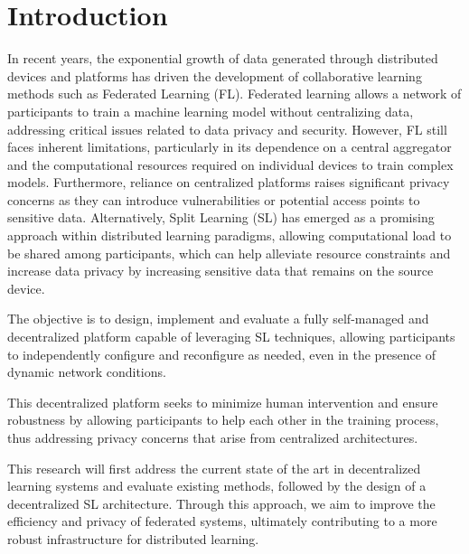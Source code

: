 
%

\chapter{Introduction}
\label{cha:introduction}


\epigraphfontsize{\small\itshape}
\setlength\epigraphwidth{12.5cm}
\setlength\epigraphrule{0pt}


In recent years, the exponential growth of data generated through distributed devices and platforms has driven the development of collaborative learning methods such as Federated Learning (FL). Federated learning allows a network of participants to train a machine learning model without centralizing data, addressing critical issues related to data privacy and security. However, FL still faces inherent limitations, particularly in its dependence on a central aggregator and the computational resources required on individual devices to train complex models. Furthermore, reliance on centralized platforms raises significant privacy concerns as they can introduce vulnerabilities or potential access points to sensitive data.
Alternatively, Split Learning (SL) has emerged as a promising approach within distributed learning paradigms, allowing computational load to be shared among participants, which can help alleviate resource constraints and increase data privacy by increasing sensitive data that remains on the source device.

The objective is to design, implement and evaluate a fully self-managed and decentralized platform capable of leveraging SL techniques, allowing participants to independently configure and reconfigure as needed, even in the presence of dynamic network conditions. 

This decentralized platform seeks to minimize human intervention and ensure robustness by allowing participants to help each other in the training process, thus addressing privacy concerns that arise from centralized architectures.

This research will first address the current state of the art in decentralized learning systems and evaluate existing methods, followed by the design of a decentralized SL architecture.
Through this approach, we aim to improve the efficiency and privacy of federated systems, ultimately contributing to a more robust infrastructure for distributed learning. 





